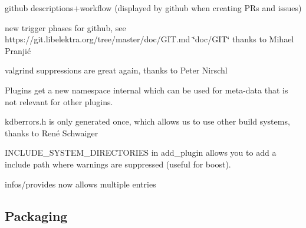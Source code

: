 \begin{DoxyItemize}
\item github descriptions+workflow (displayed by github when creating P\+Rs and issues)
\item new trigger phases for github, see https\+://git.libelektra.\+org/tree/master/doc/\+G\+IT.md \char`\"{}doc/\+G\+I\+T\char`\"{} thanks to Mihael Pranjić
\item valgrind suppressions are great again, thanks to Peter Nirschl
\item Plugins get a new namespace {\ttfamily internal} which can be used for meta-\/data that is not relevant for other plugins.
\item kdberrors.\+h is only generated once, which allows us to use other build systems, thanks to René Schwaiger
\item {\ttfamily I\+N\+C\+L\+U\+D\+E\+\_\+\+S\+Y\+S\+T\+E\+M\+\_\+\+D\+I\+R\+E\+C\+T\+O\+R\+I\+ES} in add\+\_\+plugin allows you to add a include path where warnings are suppressed (useful for boost).
\item {\ttfamily infos/provides} now allows multiple entries
\end{DoxyItemize}

\subsection*{Packaging}


